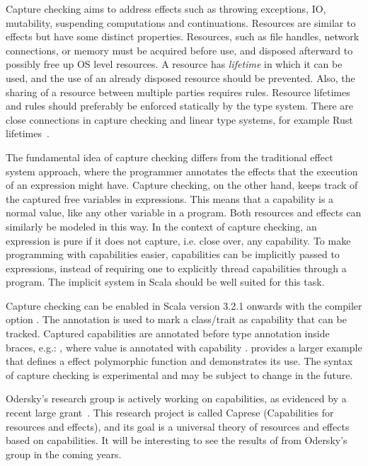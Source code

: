 Capture checking aims to address effects such as throwing exceptions, IO, mutability, suspending computations and continuations. Resources are similar to effects but have some distinct properties. Resources, such as file handles, network connections, or memory must be acquired before use, and disposed afterward to possibly free up OS level resources. A resource has \emph{lifetime} in which it can be used, and the use of an already disposed resource should be prevented. Also, the sharing of a resource between multiple parties requires rules. Resource lifetimes and rules should preferably be enforced statically by the type system. There are close connections in capture checking and linear type systems, for example Rust lifetimes~\cite{rust-lifetimes}.

The fundamental idea of capture checking differs from the traditional effect system approach, where the programmer annotates the effects that the execution of an expression might have. Capture checking, on the other hand, keeps track of the captured free variables in expressions. This means that a capability is a normal value, like any other variable in a program. Both resources and effects can similarly be modeled in this way. In the context of capture checking, an expression is pure if it does not capture, i.e. close over, any capability. To make programming with capabilities easier, capabilities can be implicitly passed to expressions, instead of requiring one to explicitly thread capabilities through a program. The implicit system in Scala should be well suited for this task.

Capture checking can be enabled in Scala version 3.2.1 onwards with the compiler option . The annotation  is used to mark a class/trait as capability that can be tracked. Captured capabilities are annotated before type annotation inside braces, e.g.: , where value  is annotated with capability .  provides a larger example that defines a effect polymorphic  function and demonstrates its use. The syntax of capture checking is experimental and may be subject to change in the future.



Odersky's research group is actively working on capabilities, as evidenced by a recent large grant~\cite{capture-checking-grant}. This research project is called Caprese (Capabilities for resources and effects), and its goal is a universal theory of resources and effects based on capabilities. It will be interesting to see the results of from Odersky's group in the coming years.
